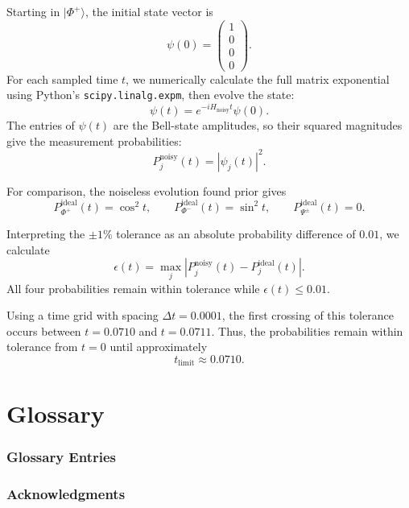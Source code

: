 \documentclass[11pt]{article}
\begin{document}
Starting in $|\Phi^+\rangle$, the initial state vector is
\[
\psi(0)=
\begin{pmatrix}
1\\0\\0\\0
\end{pmatrix}.
\]
For each sampled time $t$, we numerically calculate the full
matrix exponential using Python's
\texttt{scipy.linalg.expm}, then evolve the state:
\[
\psi(t)=e^{-iH_{\mathrm{noisy}}t}\psi(0).
\]
The entries of $\psi(t)$ are the Bell-state amplitudes, so
their squared magnitudes give the measurement probabilities:
\[
P_j^{\mathrm{noisy}}(t)=|\psi_j(t)|^2.
\]

For comparison, the noiseless evolution found prior gives
\[
P_{\Phi^+}^{\mathrm{ideal}}(t)=\cos^2 t,
\qquad
P_{\Phi^-}^{\mathrm{ideal}}(t)=\sin^2 t,
\qquad
P_{\Psi^\pm}^{\mathrm{ideal}}(t)=0.
\]

Interpreting the $\pm1\%$ tolerance as an absolute probability
difference of $0.01$, we calculate
\[
\epsilon(t)
=
\max_j
\left|
P_j^{\mathrm{noisy}}(t)-P_j^{\mathrm{ideal}}(t)
\right|.
\]
All four probabilities remain within tolerance while
$\epsilon(t)\leq0.01$.

Using a time grid with spacing $\Delta t=0.0001$, the first
crossing of this tolerance occurs between $t=0.0710$ and
$t=0.0711$. Thus, the probabilities remain within tolerance
from $t=0$ until approximately
\[
\boxed{t_{\mathrm{limit}}\approx0.0710.}
\]


\part{Glossary}


\section*{Glossary Entries}


\section*{Acknowledgments}

\end{document}
